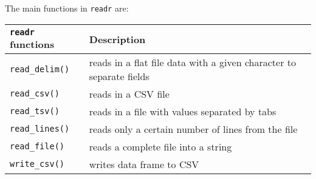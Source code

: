 \documentclass[]{article}
\begin{document}
The main functions in \texttt{readr} are:

\begin{longtable}[]{@{}ll@{}}
\toprule
\begin{minipage}[b]{0.03\columnwidth}\raggedright
\texttt{readr} functions\strut
\end{minipage} & \begin{minipage}[b]{0.91\columnwidth}\raggedright
Description\strut
\end{minipage}\tabularnewline
\midrule
\endhead
\begin{minipage}[t]{0.03\columnwidth}\raggedright
\texttt{read\_delim()}\strut
\end{minipage} & \begin{minipage}[t]{0.91\columnwidth}\raggedright
reads in a flat file data with a given character to separate
fields\strut
\end{minipage}\tabularnewline
\begin{minipage}[t]{0.03\columnwidth}\raggedright
\texttt{read\_csv()}\strut
\end{minipage} & \begin{minipage}[t]{0.91\columnwidth}\raggedright
reads in a CSV file\strut
\end{minipage}\tabularnewline
\begin{minipage}[t]{0.03\columnwidth}\raggedright
\texttt{read\_tsv()}\strut
\end{minipage} & \begin{minipage}[t]{0.91\columnwidth}\raggedright
reads in a file with values separated by tabs\strut
\end{minipage}\tabularnewline
\begin{minipage}[t]{0.03\columnwidth}\raggedright
\texttt{read\_lines()}\strut
\end{minipage} & \begin{minipage}[t]{0.91\columnwidth}\raggedright
reads only a certain number of lines from the file\strut
\end{minipage}\tabularnewline
\begin{minipage}[t]{0.03\columnwidth}\raggedright
\texttt{read\_file()}\strut
\end{minipage} & \begin{minipage}[t]{0.91\columnwidth}\raggedright
reads a complete file into a string\strut
\end{minipage}\tabularnewline
\begin{minipage}[t]{0.03\columnwidth}\raggedright
\texttt{write\_csv()}\strut
\end{minipage} & \begin{minipage}[t]{0.91\columnwidth}\raggedright
writes data frame to CSV\strut
\end{minipage}\tabularnewline
\bottomrule
\end{longtable}
\end{document}
